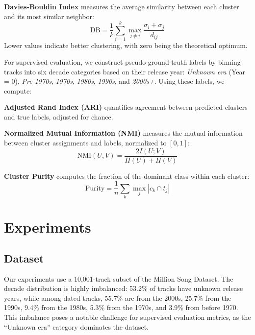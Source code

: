 \documentclass[11pt]{article}
\begin{document}
\textbf{Davies-Bouldin Index} measures the average similarity between each cluster and its most similar neighbor:
\begin{equation}
    \text{DB} = \frac{1}{k} \sum_{i=1}^{k} \max_{j \neq i} \frac{\sigma_i + \sigma_j}{d_{ij}}
\end{equation}
Lower values indicate better clustering, with zero being the theoretical optimum.

For supervised evaluation, we construct pseudo-ground-truth labels by binning tracks into six decade categories based on their release year: \textit{Unknown era} (Year = 0), \textit{Pre-1970s}, \textit{1970s}, \textit{1980s}, \textit{1990s}, and \textit{2000s+}. Using these labels, we compute:

\textbf{Adjusted Rand Index (ARI)} quantifies agreement between predicted clusters and true labels, adjusted for chance.

\textbf{Normalized Mutual Information (NMI)} measures the mutual information between cluster assignments and labels, normalized to $[0, 1]$:
\begin{equation}
    \text{NMI}(U, V) = \frac{2I(U; V)}{H(U) + H(V)}
\end{equation}

\textbf{Cluster Purity} computes the fraction of the dominant class within each cluster:
\begin{equation}
    \text{Purity} = \frac{1}{n} \sum_{k} \max_{j} |c_k \cap t_j|
\end{equation}

\section{Experiments}

\subsection{Dataset}

Our experiments use a 10,001-track subset of the Million Song Dataset. The decade distribution is highly imbalanced: 53.2\% of tracks have unknown release years, while among dated tracks, 55.7\% are from the 2000s, 25.7\% from the 1990s, 9.4\% from the 1980s, 5.3\% from the 1970s, and 3.9\% from before 1970. This imbalance poses a notable challenge for supervised evaluation metrics, as the ``Unknown era'' category dominates the dataset.
\end{document}
